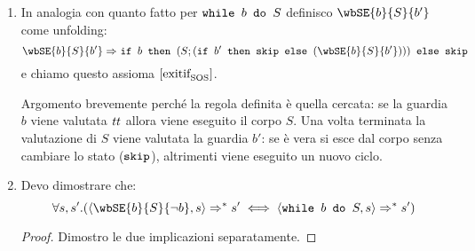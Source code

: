 {
	\begin{enumerate}
\item In analogia con quanto fatto per $\mbox{\normalfont{\texttt{while }}} b \textrm{\normalfont{\texttt{ do }}} S$ definisco $\wbSE{b}{S}{b'}$ come unfolding:
$$
\wbSE{b}{S}{b'} \Rar{ } \ifABC{b}{(S; (\ifABC{b'}{\skipForFriends}{(\wbSE{b}{S}{b'})}))}{\skipForFriends} 
$$	
e chiamo questo assioma $ [ \textrm{\normalfont{exitif}} ^ \textrm{\normalfont{}} _\textrm{\normalfont{SOS}} ] $.

Argomento brevemente perché la regola definita è quella cercata:
se la guardia $b$ viene valutata $\mbox{\textit{tt}}$ allora viene eseguito il corpo
$S$. Una volta terminata la valutazione di $S$ viene valutata la guardia $b'$:
se è vera si esce dal corpo senza cambiare lo stato ($\textrm{\normalfont{\texttt{skip}}}$),
altrimenti viene eseguito un nuovo ciclo.

\item Devo dimostrare che:
$$
\forall s, s'. (\confSs{\wbSE{b}{S}{\neg b}}{s} \Rar{*} s' \iff  \confSs{\wbS{b}{S}}{s} \Rar{*} s')
$$
\begin{proof}
Dimostro le due implicazioni separatamente.


\end{proof}
\end{enumerate}}
